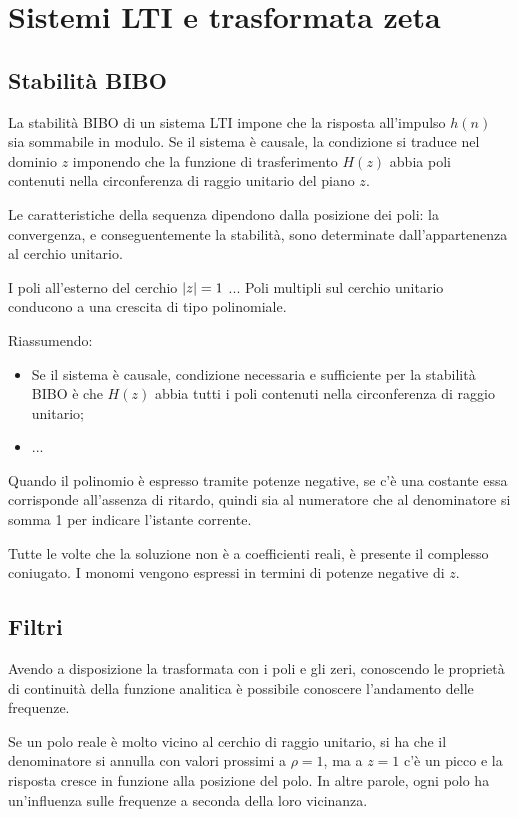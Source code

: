\section{Sistemi LTI e trasformata zeta}
\subsection{Stabilità BIBO}
La stabilità BIBO di un sistema LTI impone che la risposta all'impulso $h(n)$ sia sommabile in modulo. Se il sistema è causale, la condizione si traduce nel dominio $z$ imponendo che la funzione di trasferimento $H(z)$ abbia poli contenuti nella circonferenza di raggio unitario del piano $z$. 

Le caratteristiche della sequenza dipendono dalla posizione dei poli: la convergenza, e conseguentemente la stabilità, sono determinate dall'appartenenza al cerchio unitario.

I poli all'esterno del cerchio $\left|z\right| = 1$ ...
Poli multipli sul cerchio unitario conducono a una crescita di tipo polinomiale. 

Riassumendo:
\begin{itemize}
	\item Se il sistema è causale, condizione necessaria e sufficiente per la stabilità BIBO è che $H(z)$ abbia tutti i poli contenuti nella circonferenza di raggio unitario;
	\item ...
\end{itemize}

Quando il polinomio è espresso tramite potenze negative, se c'è una costante essa corrisponde all'assenza di ritardo, quindi sia al numeratore che al denominatore si somma 1 per indicare l'istante corrente. 

Tutte le volte che la soluzione non è a coefficienti reali, è presente il complesso coniugato. I monomi vengono espressi in termini di potenze negative di $z$.

\subsection{Filtri}
Avendo a disposizione la trasformata con i poli e gli zeri, conoscendo le proprietà di continuità della funzione analitica è possibile conoscere l'andamento delle frequenze.

Se un polo reale è molto vicino al cerchio di raggio unitario, si ha che il denominatore si annulla con valori prossimi a $\rho = 1$, ma a $z = 1$ c'è un picco e la risposta cresce in funzione alla posizione del polo. In altre parole, ogni polo ha un'influenza sulle frequenze a seconda della loro vicinanza.
 

